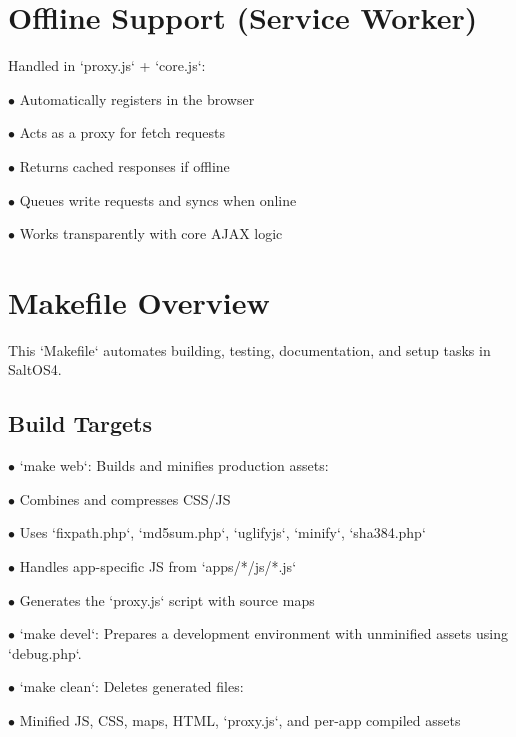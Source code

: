 \documentclass[a4paper]{article}
\begin{document}
\hypertarget{toc20}{}
\section{Offline Support (Service Worker)}

Handled in `proxy.js` + `core.js`:

\begin{compactitem}
\item[\color{myblue}$\bullet$] Automatically registers in the browser
\item[\color{myblue}$\bullet$] Acts as a proxy for fetch requests
\item[\color{myblue}$\bullet$] Returns cached responses if offline
\item[\color{myblue}$\bullet$] Queues write requests and syncs when online
\item[\color{myblue}$\bullet$] Works transparently with core AJAX logic
\end{compactitem}


\hypertarget{toc21}{}
\section{Makefile Overview}

This `Makefile` automates building, testing, documentation, and setup tasks in SaltOS4.

\hypertarget{toc22}{}
\subsection{Build Targets}

\begin{compactitem}
\item[\color{myblue}$\bullet$] `make web`: Builds and minifies production assets:
  \begin{compactitem}
  \item[\color{myblue}$\bullet$] Combines and compresses CSS/JS
  \item[\color{myblue}$\bullet$] Uses `fixpath.php`, `md5sum.php`, `uglifyjs`, `minify`, `sha384.php`
  \item[\color{myblue}$\bullet$] Handles app-specific JS from `apps/*/js/*.js`
  \item[\color{myblue}$\bullet$] Generates the `proxy.js` script with source maps
  \end{compactitem}
\item[\color{myblue}$\bullet$] `make devel`: Prepares a development environment with unminified assets using `debug.php`.
\item[\color{myblue}$\bullet$] `make clean`: Deletes generated files:
  \begin{compactitem}
  \item[\color{myblue}$\bullet$] Minified JS, CSS, maps, HTML, `proxy.js`, and per-app compiled assets
  \end{compactitem}
\end{compactitem}
\end{document}
